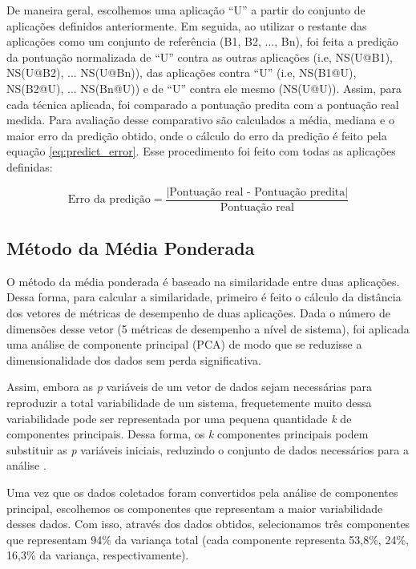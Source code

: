De maneira geral, escolhemos uma aplicação ``U'' a partir do conjunto de
aplicações definidos anteriormente. Em seguida, ao utilizar o restante das
aplicações como um conjunto de referência (B1, B2, ..., Bn), foi feita a
predição da pontuação normalizada de ``U'' contra as outras aplicações (i.e,
NS(U@B1), NS(U@B2), ... NS(U@Bn)), das aplicações contra ``U'' (i.e, NS(B1@U),
NS(B2@U), ... NS(Bn@U)) e de ``U'' contra ele mesmo (NS(U@U)). Assim, para cada
técnica aplicada, foi comparado a pontuação predita com a pontuação real
medida. Para avaliação desse comparativo são calculados a média, mediana e o
maior erro da predição obtido, onde o cálculo do erro da predição é feito pela
equação \ref{eq:predict_error}. Esse procedimento foi feito com todas as
aplicações definidas:

\begin{equation}
\label{eq:predict_error}
\textrm{Erro da predição} = \frac{|\textrm{Pontuação real - Pontuação predita}|}{\textrm{Pontuação real}}
\end{equation}

\subsection{Método da Média Ponderada}

O método da média ponderada é baseado na similaridade entre duas aplicações.
Dessa forma, para calcular a similaridade, primeiro é feito o cálculo da
distância dos vetores de métricas de desempenho de duas aplicações. Dada o
número de dimensões desse vetor (5 métricas de desempenho a nível de sistema),
foi aplicada uma análise de componente principal (PCA) de modo que se reduzisse
a dimensionalidade dos dados sem perda significativa.

Assim, embora as \textit{p} variáveis de um vetor de dados sejam necessárias
para reproduzir a total variabilidade de um sistema, frequetemente muito dessa
variabilidade pode ser representada por uma pequena quantidade \textit{k} de
componentes principais. Dessa forma, os \textit{k} componentes principais podem
substituir  as \textit{p} variáveis iniciais, reduzindo o conjunto de dados
necessários para a análise \cite{johnson1988}.

Uma vez que os dados coletados foram convertidos pela análise de componentes
principal, escolhemos os componentes que representam a maior variabilidade
desses dados. Com isso, através dos dados obtidos, selecionamos três
componentes que representam 94\% da variança total (cada componente representa
53,8\%, 24\%, 16,3\% da variança, respectivamente).

